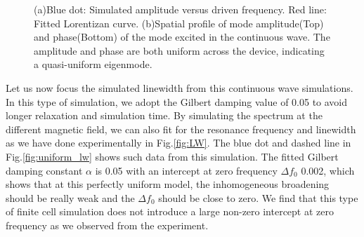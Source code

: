 \begin{figure}[t]
\centering     
{}
\caption{(a)Blue dot: Simulated amplitude versus driven frequency. Red line: Fitted Lorentizan curve. (b)Spatial profile of mode amplitude(Top) and phase(Bottom) of the mode excited in the continuous wave. The amplitude and phase are both uniform across the device, indicating a quasi-uniform eigenmode. }
\end{figure}


Let us now focus the simulated linewidth from this continuous wave simulations. In this type of simulation, we adopt the Gilbert damping value of 0.05 to avoid longer relaxation and simulation time. By simulating the spectrum at the different magnetic field, we can also fit for the resonance frequency and linewidth as we have done experimentally in Fig.\ref{fig:LW}. The blue dot and dashed line in Fig.\ref{fig:uniform_lw} shows such data from this simulation. The fitted  Gilbert damping constant $\alpha$ is 0.05 with an intercept at zero frequency $\Delta f_0$ 0.002, which shows that at this perfectly uniform model, the inhomogeneous broadening should be really weak and the $\Delta f_0$ should be close to zero. We find that this type of finite cell simulation does not introduce a large non-zero intercept at zero frequency as we observed from the experiment.


